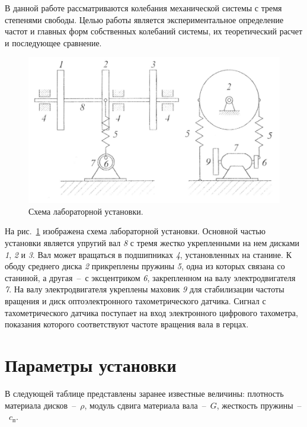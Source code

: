 \documentclass[12pt, a4paper]{article}
\begin{document}
    В данной работе рассматриваются колебания механической системы с тремя степенями свободы. Целью работы является экспериментальное определение частот и главных форм собственных колебаний системы, их теоретический расчет и последующее сравнение.
    
    \begin{figure} [h]
        \centering
        \includegraphics [width = 13cm] {Lab_4_1.png}
        \caption{\centering Схема лабораторной установки.}
        \label{im1}
    \end{figure}
    
    На рис.~\ref{im1} изображена схема лабораторной установки. Основной частью установки является упругий вал \textit{8} с тремя жестко укрепленными на нем дисками \textit{1}, \textit{2} и \textit{3}. Вал может вращаться в подшипниках \textit{4}, установленных на станине. К ободу среднего диска \textit{2} прикреплены пружины \textit{5}, одна из которых связана со станиной, а другая~--~с эксцентриком \textit{6}, закрепленном на валу электродвигателя \textit{7}. На валу электродвигателя укреплены маховик \textit{9} для стабилизации частоты вращения и диск оптоэлектронного тахометрического датчика. Сигнал с тахометрического датчика поступает на вход электронного цифрового тахометра, показания которого соответствуют частоте вращения вала в герцах.
    
    \newpage
    
    \section{Параметры установки}
    
    В следующей таблице представлены заранее известные величины: плотность материала дисков~--~$\rho$, модуль сдвига материала вала~--~$G$, жесткость пружины~--~$c_{\text{п}}$.
    
\end{document}
